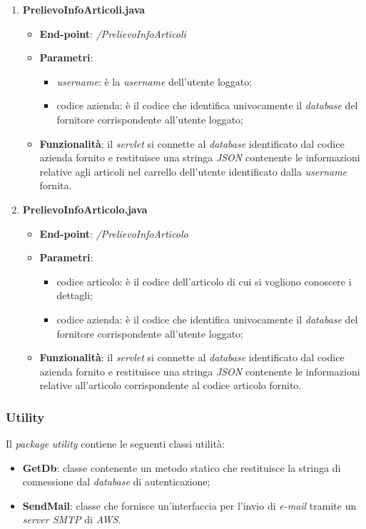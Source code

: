 \documentclass[12pt, a4paper, titlepage]{report}
\begin{document}
\begin{enumerate}
		\item \textbf{PrelievoInfoArticoli.java}
		\begin{itemize}
			\item \textbf{End-point}: \textit{/PrelievoInfoArticoli}
			\item \textbf{Parametri}:
			\begin{itemize}
				\item \textit{username}: è la \textit{username} dell'utente loggato;
				\item codice azienda: è il codice che identifica univocamente il \textit{database} del fornitore corrispondente all'utente loggato;
			\end{itemize}
			\item \textbf{Funzionalità}: il \textit{servlet} si connette al \textit{database} identificato dal codice azienda fornito e restituisce una stringa \textit{JSON} contenente le informazioni relative agli articoli nel carrello dell'utente identificato dalla \textit{username} fornita.
		\end{itemize}
	
		\item \textbf{PrelievoInfoArticolo.java}
		\begin{itemize}
			\item \textbf{End-point}: \textit{/PrelievoInfoArticolo}
			\item \textbf{Parametri}:
			\begin{itemize}
				\item codice articolo: è il codice dell'articolo di cui si vogliono conoscere i dettagli;
				\item codice azienda: è il codice che identifica univocamente il \textit{database} del fornitore corrispondente all'utente loggato;
			\end{itemize}
			\item \textbf{Funzionalità}: il \textit{servlet} si connette al \textit{database} identificato dal codice azienda fornito e restituisce una stringa \textit{JSON} contenente le informazioni relative all'articolo corrispondente al codice articolo fornito.
		\end{itemize}
	\end{enumerate}
	
	\subsubsection{Utility}
	Il \textit{package} \textit{utility} contiene le seguenti classi utilità:
	\begin{itemize}
		\item \textbf{GetDb}: classe contenente un metodo statico che restituisce la stringa di connessione dal \textit{database} di autenticazione;
		\item \textbf{SendMail}: classe che fornisce un'interfaccia per l'invio di \textit{e-mail} tramite un \textit{server SMTP} di \textit{AWS}.
	\end{itemize}
	
\end{document}
